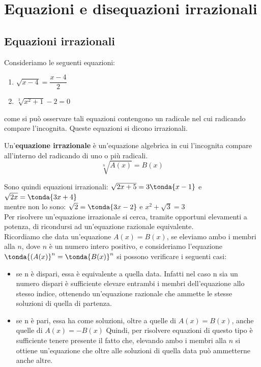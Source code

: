 \section{Equazioni e disequazioni irrazionali}
\label{sec:irvalass_irraz}

\subsection{Equazioni irrazionali}

Consideriamo le seguenti equazioni:
\begin{enumerate}
 \item \(\sqrt{x-4} = \dfrac{x-4}{2}\)
 \item \(\sqrt[3]{x^{2}+1} -2=0\)
\end{enumerate}

come si può osservare tali equazioni contengono un radicale nel cui radicando 
compare  l'incognita.
Queste equazioni si dicono irrazionali.
\begin{definizione}
 Un'\textbf{equazione irrazionale} è un'equazione algebrica in cui l'incognita 
compare all'interno del radicando di uno o più radicali.
\[\sqrt[n]{A(x)} = B(x)\]
\end{definizione}

\vspace{5pt}

\noindent Sono quindi equazioni irrazionali: 
\(\sqrt{2x+5} = 3\tonda{x-1}\) \quad e \quad \(\sqrt{2x} = \tonda{3x+4}\)  \\
mentre non lo sono: \(\sqrt{2} = \tonda{3x-2}\) \quad e \quad 
\(x^2 + \sqrt{3} = 3\) 
\\[4pt]
Per risolvere un'equazione irrazionale si cerca, tramite opportuni elevamenti a 
potenza, di ricondursi ad un'equazione razionale equivalente.
\\[4pt]
Ricordiamo che data un'equazione \(A(x)=B(x)\), se eleviamo ambo i membri alla 
\(n\), dove \(n\) è un numero intero positivo, e consideriamo l'equazione 
\(\tonda{(A(x)}^n=\tonda{B(x)}^n\) si possono verificare i seguenti casi:
\begin{itemize}
 \item 
 se n è dispari, essa è equivalente a quella data.
Infatti nel caso n sia un numero dispari è sufficiente elevare entrambi i 
membri 
dell'equazione allo stesso indice, ottenendo  un'equazione razionale che 
ammette 
le stesse soluzioni di quella di partenza.
 \item 
 se n è pari, essa ha come soluzioni, oltre a quelle di \(A(x)=B(x)\), anche 
quelle di \(A(x) = -B(x)\)
Quindi, per risolvere equazioni di questo tipo è sufficiente tenere presente il 
fatto che, elevando ambo i membri alla \(n\) si ottiene un'equazione che 
oltre alle soluzioni di quella data può ammetterne anche altre.
\end{itemize}

